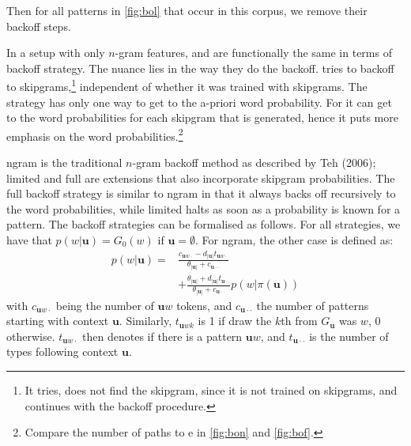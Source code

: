 Then for all patterns in \cref{fig:bol} that occur in this corpus, we remove their backoff steps.



In a setup with only $n$-gram features, \BON and \BOF are functionally the same in terms of backoff strategy. The nuance lies in the way they do the backoff. \BOF tries to backoff to skipgrams,\footnote{It tries, does not find the skipgram, since it is not trained on skipgrams, and continues with the backoff procedure.} independent of whether it was trained with skipgrams. The \BON strategy has only one way to get to the a-priori word probability. 
For \BOF it can get to the word probabilities for each skipgram that is generated, hence it puts more emphasis on the word probabilities.\footnote{Compare the number of paths to e in \cref{fig:bon} and \cref{fig:bof}.}

{\sf ngram} is the traditional $n$-gram backoff method as described by Teh (2006); {\sf limited} and {\sf full} are extensions that also incorporate skipgram probabilities. The {\sf full} backoff strategy is similar to {\sf ngram} in that it always backs off recursively to the word probabilities, while {\sf limited} halts as soon as a probability is known for a pattern. The backoff strategies can be formalised as follows.
%
For all strategies, we have that $p(w|\mathbf{u})=G_0(w)$ if $\mathbf{u} = \emptyset$. For {\sf ngram}, the other case is defined as:
  \begin{equation*}\begin{split}
  	p(w|\mathbf{u})= &
\frac{c_{\mathbf{u}w\cdot}-d_{|\mathbf{u}|}t_{\mathbf{u}w\cdot}}{\theta_{|\mathbf{u}|}+c_{\mathbf{u}\cdot\cdot}} \\
& +
\frac{\theta_{|\mathbf{u}|}+d_{|\mathbf{u}|}t_{\mathbf{u}\cdot\cdot}}{\theta_{|\mathbf{u}|}+c_{\mathbf{u}\cdot\cdot}}
p(w|\pi(\mathbf{u}))
  \end{split}\end{equation*}
with $c_{\mathbf{u}w\cdot}$ being the number of $\mathbf{u}w$ tokens, and $c_{\mathbf{u}\cdot\cdot}$ the number of patterns starting with context $\mathbf{u}$. Similarly, $t_{\mathbf{u}wk}$ is 1 if draw the $k$th from $G_{\mathbf{u}}$ was $w$, 0 otherwise. $t_{\mathbf{u}w\cdot}$ then denotes if there is a pattern $\mathbf{u}w$, and $t_{\mathbf{u}\cdot\cdot}$ is the number of types following context $\mathbf{u}$.
  
